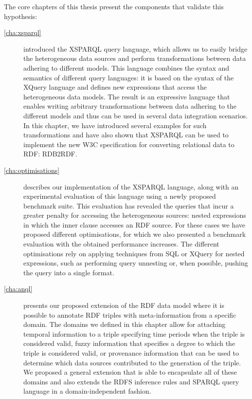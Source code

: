 The core chapters of this thesis present the components that validate this hypothesis:
\begin{description}

\item[\cref{cha:xsparql}] introduced the XSPARQL query language, which allows us to easily bridge the heterogeneous data
  sources and perform transformations between data adhering to different models.
  This language combines the syntax and semantics of different query languages: it is based on the syntax of the XQuery
  language and defines new expressions that access the heterogeneous data models.  The result is an expressive language
  that enables writing arbitrary transformations between data adhering to the different models and thus can be used in
  several data integration scenarios.
  In this chapter, we have introduced several examples for such transformations and have also shown that XSPARQL can be
  used to implement the new \ac{W3C} specification for converting relational data to \ac{RDF}: RDB2RDF.

\item[\cref{cha:optimisations}] describes our implementation of the XSPARQL language, along with an experimental
  evaluation of this language using a newly proposed benchmark suite.
  This evaluation has revealed the queries that incur a greater penalty for accessing the heterogeneous sources: nested
  \FOR expressions in which the inner clause accesses an \ac{RDF} source.
  For these cases we have proposed different optimisations, for which we also presented a benchmark evaluation with the
  obtained performance increases.
  The different optimisations rely on applying techniques from \ac{SQL} or XQuery for nested expressions, such as
  performing query unnesting or, when possible, pushing the query into a single format.

\item[\cref{cha:anql}] presents our proposed extension of the \ac{RDF} data model where it is possible to annotate
  \ac{RDF} triples with meta-information from a specific domain.  The domains we defined in this chapter allow for
  attaching temporal information to a triple specifying time periods when the triple is considered valid, fuzzy
  information that specifies a degree to which the triple is considered valid, or provenance information that can be
  used to determine which data sources contributed to the generation of the triple.
  We proposed a general extension that is able to encapsulate all of these domains and also extends the \ac{RDFS}
  inference rules and SPARQL query language in a domain-independent fashion.

\end{description}

